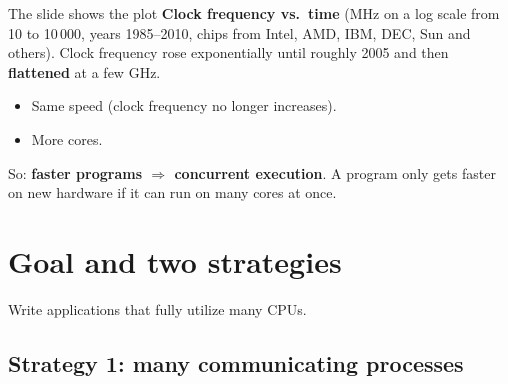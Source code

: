 \documentclass[11pt,a4paper]{article}
\begin{document}
The slide shows the plot \textbf{Clock frequency vs.\ time} (MHz on a log
scale from 10 to 10\,000, years 1985--2010, chips from Intel, AMD, IBM,
DEC, Sun and others). Clock frequency rose exponentially until roughly
2005 and then \textbf{flattened} at a few GHz.

\begin{center}
\end{center}

\begin{keybox}
\begin{itemize}
  \item Same speed (clock frequency no longer increases).
  \item More cores.
\end{itemize}
So: \textbf{faster programs \(\Rightarrow\) concurrent execution}. A
program only gets faster on new hardware if it can run on many cores at
once.
\end{keybox}

\section{Goal and two strategies}

\begin{defbox}[Goal]
Write applications that fully utilize many CPUs.
\end{defbox}

\subsection{Strategy 1: many communicating processes}
\end{document}
